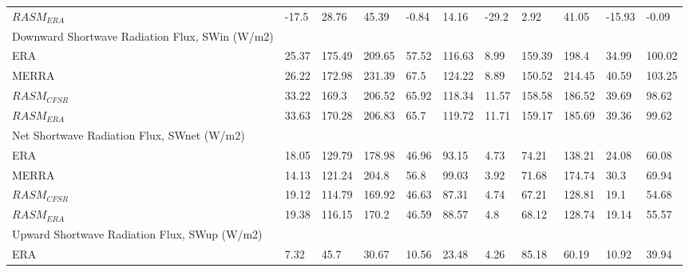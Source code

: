 \begin{table}
{\begin{tabular}{lllllllllll}
$RASM_{ERA}$                                        & -17.5                        & 28.76  & 45.39  & -0.84  & 14.16  & -29.2  & 2.92   & 41.05  & -15.93 & -0.09  \\
Downward Shortwave Radiation Flux, SWin (W/m2) &                              &        &        &        &        &        &        &        &        &        \\
ERA                                            & 25.37                        & 175.49 & 209.65 & 57.52  & 116.63 & 8.99   & 159.39 & 198.4  & 34.99  & 100.02 \\
MERRA                                          & 26.22                        & 172.98 & 231.39 & 67.5   & 124.22 & 8.89   & 150.52 & 214.45 & 40.59  & 103.25 \\
$RASM_{CFSR}$                                       & 33.22                        & 169.3  & 206.52 & 65.92  & 118.34 & 11.57  & 158.58 & 186.52 & 39.69  & 98.62  \\
$RASM_{ERA}$                                        & 33.63                        & 170.28 & 206.83 & 65.7   & 119.72 & 11.71  & 159.17 & 185.69 & 39.36  & 99.62  \\
Net Shortwave Radiation Flux, SWnet (W/m2)     &                              &        &        &        &        &        &        &        &        &        \\
ERA                                            & 18.05                        & 129.79 & 178.98 & 46.96  & 93.15  & 4.73   & 74.21  & 138.21 & 24.08  & 60.08  \\
MERRA                                          & 14.13                        & 121.24 & 204.8  & 56.8   & 99.03  & 3.92   & 71.68  & 174.74 & 30.3   & 69.94  \\
$RASM_{CFSR}$                                       & 19.12                        & 114.79 & 169.92 & 46.63  & 87.31  & 4.74   & 67.21  & 128.81 & 19.1   & 54.68  \\
$RASM_{ERA}$                                        & 19.38                        & 116.15 & 170.2  & 46.59  & 88.57  & 4.8    & 68.12  & 128.74 & 19.14  & 55.57  \\
Upward Shortwave Radiation Flux, SWup (W/m2)   &                              &        &        &        &        &        &        &        &        &        \\
ERA                                            & 7.32                         & 45.7   & 30.67  & 10.56  & 23.48  & 4.26   & 85.18  & 60.19  & 10.92  & 39.94  \\

\end{tabular}}
\end{table}
